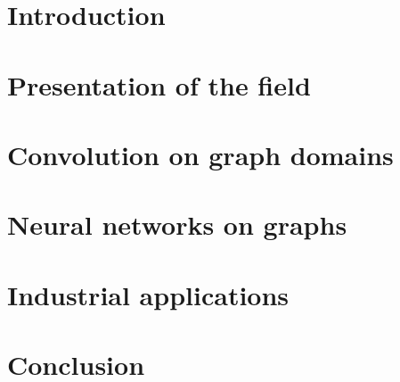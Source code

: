 \documentclass[12pt]{book}
\begin{document}

%
%


%
%

\dominitoc
\tableofcontents
\adjustmtc

%
%

\chapter*{Introduction}
\label{chp:int}
\todo{}
%

%
%

\chapter{Presentation of the field}

\vfill\minitoc\newpage

\newpage
\newpage
\newpage

%
%
\chapter{Convolution on graph domains}

\vfill\minitoc\newpage

\newpage
\newpage
\newpage
\newpage

%
%

\chapter{Neural networks on graphs}
\vfill\minitoc\newpage

%
%

\chapter{Industrial applications}
\todo{}
\vfill\minitoc\newpage

%
%

\chapter*{Conclusion}
\label{chp:ccl}
\todo{}
\end{document}
